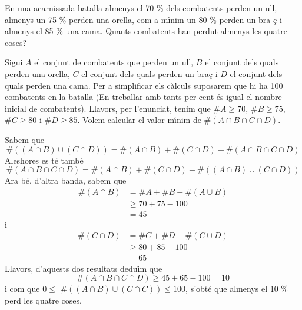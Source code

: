 \begin{exercici}
En una acarnissada batalla almenys el 70 \% dels combatents perden un ull,
almenys un 75 \% perden una orella, com a m\'{\i}nim un 80 \% perden un bra%
\c{c} i almenys el 85 \% una cama. Quants combatents han perdut almenys les
quatre coses?
\end{exercici}

\begin{solucio}
Sigui $A$ el conjunt de combatents que perden un ull, $B$ el conjunt dels
quals perden una orella, $C$ el conjunt dels quals perden un bra\c{c} i $D$
el conjunt dels quals perden una cama. Per a simplificar els c\`{a}lculs
suposarem que hi ha 100 combatents en la batalla (En treballar amb tants per
cent \'{e}s igual el nombre inicial de combatents). Llavors, per l'enunciat,
tenim que $\#A\geq 70$, $\#B\geq 75$, $\#C\geq 80$ i $\#D\geq 85$. Volem
calcular el valor m\'{\i}nim de $\#\left( A\cap B\cap C\cap D\right) $.

Sabem que%
\begin{equation*}
\#\left( \left( A\cap B\right) \cup \left( C\cap D\right) \right) =\#\left(
A\cap B\right) +\#\left( C\cap D\right) -\#\left( A\cap B\cap C\cap D\right)
\end{equation*}%
Aleshores es t\'{e} tamb\'{e}%
\begin{equation*}
\#\left( A\cap B\cap C\cap D\right) =\#\left( A\cap B\right) +\#\left( C\cap
D\right) -\#\left( \left( A\cap B\right) \cup \left( C\cap D\right) \right)
\end{equation*}%
Ara b\'{e}, d'altra banda, sabem que%
\begin{align*}
\#\left( A\cap B\right) & =\#A+\#B-\#\left( A\cup B\right) \\
& \geq 70+75-100 \\
& =45
\end{align*}%
i%
\begin{align*}
\#\left( C\cap D\right) & =\#C+\#D-\#\left( C\cup D\right) \\
& \geq 80+85-100 \\
& =65
\end{align*}%
Llavors, d'aquests dos resultats dedu\"{\i}m que%
\begin{equation*}
\#\left( A\cap B\cap C\cap D\right) \geq 45+65-100=10
\end{equation*}%
i com que $0\leq $ $\#\left( \left( A\cap B\right) \cup \left( C\cap
C\right) \right) \leq 100$, s'obt\'{e} que almenys el 10 \% perd les quatre
coses.
\end{solucio}

